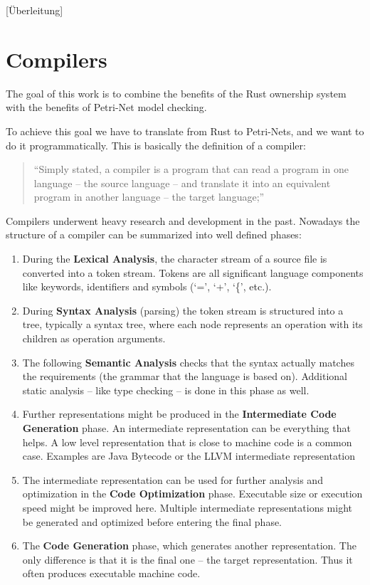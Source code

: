 
[Überleitung]

\section{Compilers}
The goal of this work is to combine the benefits of the Rust ownership system with the benefits of Petri-Net model checking.

To achieve this goal we have to translate from Rust to Petri-Nets, 
and we want to do it programmatically.
This is basically the definition of a compiler\cite[Chapter 1.1]{aho1986compilers}:
\begin{quote}
``Simply stated, a compiler is a program that can read a program in one language -- the source language -- and translate it into an equivalent program in another language -- the target language;''
\end{quote}

Compilers underwent heavy research and development in the past.
Nowadays the structure of a compiler can be summarized into well defined phases\cite[Chapter 1.2]{aho1986compilers}:

\begin{enumerate}
  \item During the \textbf{Lexical Analysis}, the character stream of a source file is converted into a token stream.
  Tokens are all significant language components like keywords, identifiers and symbols (`=', `+', `\{', etc.).
  \item During \textbf{Syntax Analysis} (parsing) the token stream is structured into a tree,
  typically a syntax tree, where each node represents an operation with its children as operation arguments.
  \item The following \textbf{Semantic Analysis} checks that the syntax actually matches the requirements (the grammar that the language is based on).\newline
  Additional static analysis -- like type checking -- is done in this phase as well.
  \item Further representations might be produced in the \textbf{Intermediate Code Generation} phase.
  An intermediate representation can be everything that helps.
  A low level representation that is close to machine code is a common case.
  Examples are Java Bytecode or the LLVM intermediate representation
  \item The intermediate representation can be used for further analysis and optimization in the \textbf{Code Optimization} phase.
  Executable size or execution speed might be improved here.
  Multiple intermediate representations might be generated and optimized before entering the final phase.
  \item The \textbf{Code Generation} phase, which generates another representation.
  The only difference is that it is the final one -- the target representation.
  Thus it often produces executable machine code.
\end{enumerate}


